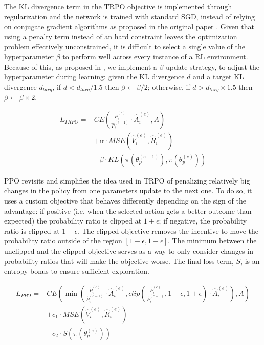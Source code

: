 \documentclass{article}
\begin{document}
The KL divergence term in the TRPO objective is implemented through regularization and the network is trained with standard SGD, instead of relying on conjugate gradient algorithms as proposed in the original paper \cite{trpo}. Given that using a penalty term instead of an hard constraint leaves the optimization problem effectively unconstrained, it is difficult to select a single value of the hyperparameter $\beta$ to perform well across every instance of a RL environment. Because of this, as proposed in \cite{ppo}, we implement a $\beta$ update strategy, to adjust the hyperparameter during learning: given the KL divergence $d$ and a target KL divergence $d_{targ}$, if $d<d_{targ}/1.5$ then $\beta\leftarrow\beta/2$; otherwise, if $d>d_{targ}\times 1.5$ then $\beta\leftarrow\beta\times 2$.

\begin{equation}
  \label{eq:trpo}
  \begin{aligned}
    L_{TRPO}={} & CE\left(\frac{\hat{P}_i^{(e)}}{\hat{P}_i^{(e-1)}}\cdot \hat{A}_i^{(e)}, A\right) \\
    & + \alpha\cdot MSE\left(\hat{V}_i^{(e)}, \hat{R}_i^{(e)}\right) \\
    & - \beta\cdot KL\left(\pi(\theta_p^{(e-1)}), \pi(\theta_p^{(e)})\right)
  \end{aligned}
\end{equation}

PPO revisits and simplifies the idea used in TRPO of penalizing relatively big changes in the policy from one parameters update to the next one. To do so, it uses a custom objective that behaves differently depending on the sign of the advantage: if positive (i.e. when the selected action gets a better outcome than expected) the probability ratio is clipped at $1+\epsilon$; if negative, the probability ratio is clipped at $1-\epsilon$. The clipped objective removes the incentive to move the probability ratio outside of the region $[1-\epsilon, 1+\epsilon]$. The minimum between the unclipped and the clipped objective serves as a way to only consider changes in probability ratios that will make the objective worse. The final loss term, $S$, is an entropy bonus to ensure sufficient exploration.

\begin{equation}
  \label{eq:ppo}
  \begin{aligned}
    L_{PPO}={} & CE\left(\min\left(\frac{\hat{P}_i^{(e)}}{\hat{P}_i^{(e-1)}}\cdot \hat{A}_i^{(e)}, clip\left(\frac{\hat{P}_i^{(e)}}{\hat{P}_i^{(e-1)}}, 1-\epsilon, 1+\epsilon\right)\cdot \hat{A}_i^{(e)}\right), A\right) \\
    & + c_1\cdot MSE\left(\hat{V}_i^{(e)}, \hat{R}_i^{(e)}\right) \\
    & - c_2\cdot S\left(\pi(\theta_p^{(e)})\right) \\
  \end{aligned}
\end{equation}
\end{document}
